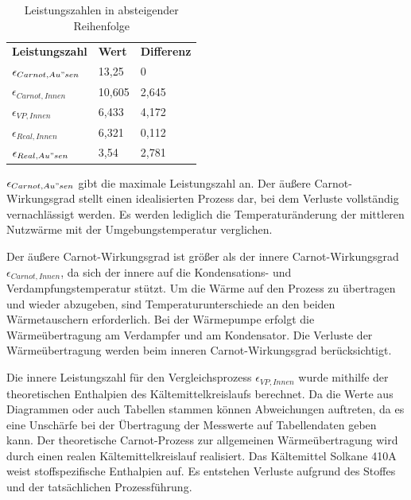 \begin{table}[!ht]
    \centering
    \caption{Leistungszahlen in absteigender Reihenfolge}
    \label{tab:Leistungszahlen}
    \begin{tabular}{|l|l|l|}
        \hline
    \rowcolor[HTML]{70AD47} 
    {\color[HTML]{333333} \textbf{Leistungszahl}}  & {\color[HTML]{333333} \textbf{Wert}} & {\color[HTML]{333333} \textbf{Differenz}} \\
    \rowcolor[HTML]{C6E0B4} 
    $\epsilon_{Carnot,Au"sen}$ & 13,25                                & 0                                         \\ \hline
    \rowcolor[HTML]{E2EFDA} 
    $\epsilon_{Carnot,Innen}$  & 10,605                               & 2,645                                     \\ \hline
    \rowcolor[HTML]{C6E0B4} 
    $\epsilon_{VP,Innen}$      & 6,433                                & 4,172                                     \\ \hline
    \rowcolor[HTML]{E2EFDA} 
    $\epsilon_{Real,Innen}$    & 6,321                                & 0,112                                     \\ \hline
    \rowcolor[HTML]{C6E0B4} 
    $\epsilon_{Real,Au"sen}$   & 3,54                                 & 2,781                                     \\ \hline
    \end{tabular}%
    \end{table}

$\epsilon_{Carnot,Au"sen}$ gibt die maximale Leistungszahl an. 
Der äußere Carnot-Wirkungsgrad stellt einen idealisierten Prozess dar, bei dem Verluste vollständig vernachlässigt werden. 
Es werden lediglich die Temperaturänderung der mittleren Nutzwärme mit der Umgebungstemperatur verglichen.

Der äußere Carnot-Wirkungsgrad ist größer als der innere Carnot-Wirkungsgrad $\epsilon_{Carnot,Innen}$, da sich der innere auf die Kondensations- und Verdampfungstemperatur stützt. 
Um die Wärme auf den Prozess zu übertragen und wieder abzugeben, sind Temperaturunterschiede an den beiden Wärmetauschern erforderlich. 
Bei der Wärmepumpe erfolgt die Wärmeübertragung am Verdampfer und am Kondensator. 
Die Verluste der Wärmeübertragung werden beim inneren Carnot-Wirkungsgrad berücksichtigt.

Die innere Leistungszahl für den Vergleichsprozess $\epsilon_{VP,Innen}$ wurde mithilfe der theoretischen Enthalpien des Kältemittelkreislaufs berechnet.
Da die Werte aus Diagrammen oder auch Tabellen stammen können Abweichungen auftreten, da es eine Unschärfe bei der Übertragung der Messwerte auf Tabellendaten geben kann. 
Der theoretische Carnot-Prozess zur allgemeinen Wärmeübertragung wird durch einen realen Kältemittelkreislauf realisiert. 
Das Kältemittel Solkane 410A weist stoffspezifische Enthalpien auf. 
Es entstehen Verluste aufgrund des Stoffes und der tatsächlichen Prozessführung.

